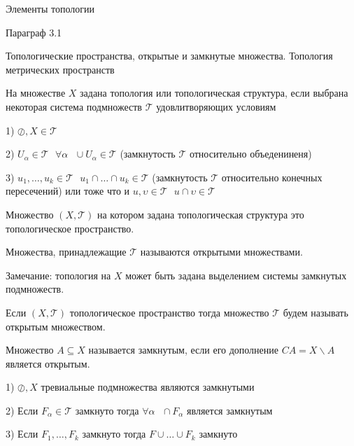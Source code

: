 \begin{title}
  Элементы топологии
\end{title}

\begin{title}[\Large]
  Параграф 3.1
\end{title}

\begin{title}[\Large]
  Топологические пространства, открытые и замкнутые множества. Топология
  метрических пространств
\end{title}

\begin{define}
  На множестве $X$ задана топология или топологическая структура, если
  выбрана некоторая система подмножеств $\mathcal{T}$ удовлитворяющих условиям

  1) $\oslash, X \in \mathcal{T}$

  2) $U_{\alpha} \in \mathcal{T} ~~~ \forall \alpha ~~~ \cup U_{\alpha} \in
  \mathcal{T}$ (замкнутость $\mathcal{T}$ относительно объедениненя)

  3) $u_1, \ldots, u_k \in \mathcal{T} ~~~ u_1 \cap \ldots \cap u_k \in
  \mathcal{T}$ (замкнутость $\mathcal{T}$ относительно конечных пересечений)
  или тоже что и $u, \upsilon \in \mathcal{T} ~~~ u \cap \upsilon \in
  \mathcal{T}$
\end{define}

\begin{define}
  Множество $(X, \mathcal{T})$ на котором задана топологическая структура это
  топологическое пространство.

  Множества, принадлежащие $\mathcal{T}$ называются открытыми множествами.

  Замечание: топология на $X$ может быть задана выделением системы замкнутых
  подмножеств.
\end{define}

\begin{define}
  Если $(X, \mathcal{T})$ топологическое пространство тогда множество
  $\mathcal{T}$ будем называть открытым множеством.
\end{define}

\begin{define}
  Множество $A \subseteq X$ называется замкнутым, если его дополнение
  $CA = X \backslash A$ является открытым.
\end{define}

\begin{block}
  1) $\oslash, X$ тревиальные подмножества являются замкнутыми

  2) Если $F_{\alpha} \in \mathcal{T}$ замкнуто тогда $\forall \alpha ~~~
  \cap F_{\alpha}$ является замкнутым

  3) Если $F_1, \ldots, F_k$ замкнуто тогда $F \cup \ldots \cup F_k$ замкнуто
\end{block}

